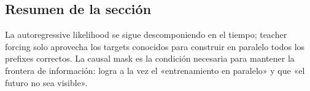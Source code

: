 
\subsection{Resumen de la sección}

La autoregressive likelihood se sigue descomponiendo en el tiempo; teacher forcing solo aprovecha los targets conocidos para construir en paralelo todos los prefixes correctos. La causal mask es la condición necesaria para mantener la frontera de información: logra a la vez el «entrenamiento en paralelo» y que «el futuro no sea visible».
